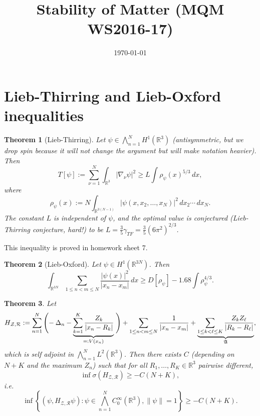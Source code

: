 \documentclass[11pt]{amsart}
\newcommand{\R}{\mathbb{R}}
\newtheorem{thm}{Theorem}
\theoremstyle{definition}
\theoremstyle{definition}
\theoremstyle{definition}
\numberwithin{equation}{section}
\begin{document}
\title[]{Stability of Matter (MQM WS2016-17)}
\date{\today}

\maketitle

\section{Lieb-Thirring and Lieb-Oxford inequalities}

\begin{thm}[Lieb-Thirring]
Let $\psi\in\bigwedge_{n=1}^NH^1(\R^3)$ (antisymmetric, but we drop spin because it will not change the argument but will make notation heavier). Then
\begin{equation}\label{eqn:lt}
T[\psi]:=\sum_{\nu=1}^N\int_{\R^3}|\nabla_\nu \psi|^2\ge L\int\rho_\psi(x)^{5/3}\,dx,
\end{equation}
where
\[
\rho_\psi(x):=N\int_{\R^{3(N-1)}}|\psi(x,x_2,\ldots,x_N)|^2\,dx_2\cdots\,dx_N.
\]
The constant $L$ is independent of $\psi$, and the optimal value is conjectured (Lieb-Thirring conjecture, hard!) to be $L=\frac{3}{5}\gamma_{TF}=\frac{3}{5}(6\pi^2)^{2/3}$.
\end{thm}
This inequality is proved in homework sheet 7.

\begin{thm}[Lieb-Oxford]
Let $\psi\in H^1(\R^{3N})$. Then
\begin{equation}\label{eqn:lieb-oxford}
\int_{\R^{3N}}\sum_{1\le n<m\le N}\frac{|\psi(x)|^2}{|x_n-x_m|}\,dx\ge D[\rho_\psi]-1.68\int\rho_\psi^{4/3}.
\end{equation}
\end{thm}


\begin{thm}
Let 
\begin{equation}\label{eqn:hamiltonian}
H_{\mathcal{Z},\mathcal{R}}:=\sum_{n=1}^N\left(\vphantom{\sum_{k=1}^k\frac{Z_k}{|x_n-R_k|}}\right.\!\!-\Delta_n-\underbrace{\sum_{k=1}^K\frac{Z_k}{|x_n-R_k|}}_{=:V(x_n)}\left.\vphantom{\sum_{k=1}^N}\right)+\sum_{1\le n<m\le N}\frac{1}{|x_n-x_m|}+\underbrace{\sum_{1\le k<\ell\le K}\frac{Z_kZ_\ell}{|R_k-R_\ell|}}_{\mathfrak{A}},
\end{equation}
which is self adjoint in $\bigwedge_{n=1}^NL^2(\R^3)$. Then there exists $C$ (depending on $N+K$ and the maximum $Z_n$) such that for all $R_1,\ldots,R_K\in\R^3$ pairwise different,
\begin{equation}
\inf \sigma(H_{\mathcal{Z},\mathcal{R}})\ge -C(N+K),
\end{equation}
i.e.
\[
\inf\left\{(\psi,H_{\mathcal{Z},\mathcal{R}}\psi):\psi\in\bigwedge_{n=1}^NC_0^\infty(\R^3),\|\psi\|=1\right\}\ge-C(N+K).
\]
\end{thm}
\end{document}
